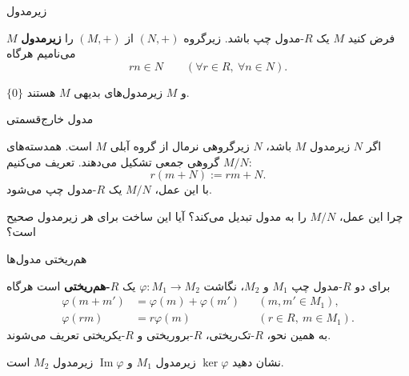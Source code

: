 \begin{frame}{زیرمدول}
    \label{lec04:submodule}
    \begin{definition}
        فرض کنید $M$ یک $R$-مدول چپ باشد.
        زیرگروه $(N,+)$ از $(M,+)$ را \textbf{زیرمدول} $M$ می‌نامیم هرگاه
        \[
            rn\in N\qquad(\forall r\in R,\ \forall n\in N).
        \]
    \end{definition}
    \begin{example}
        $\{0\}$ و $M$ زیرمدول‌های بدیهی $M$ هستند.
    \end{example}
\end{frame}

\begin{frame}{مدول خارج‌قسمتی}
    \label{lec04:quotient-module}
    \begin{definition}
        اگر $N$ زیرمدول $M$ باشد، $N$ زیرگروهی نرمال از گروه آبلی $M$ است.
        همدسته‌های $M/N$ گروهی جمعی تشکیل می‌دهند. تعریف می‌کنیم:
        \[
            r(m+N):=rm+N.
        \]
        با این عمل، $M/N$ یک $R$-مدول چپ می‌شود.
    \end{definition}
    \begin{exercise}
        چرا این عمل، $M/N$ را به مدول تبدیل می‌کند؟
        آیا این ساخت برای هر زیرمدول صحیح است؟
    \end{exercise}
\end{frame}

\begin{frame}{هم‌ریختی مدول‌ها}
    \label{lec04:module-homomorphism}
    \begin{definition}
        برای دو $R$-مدول چپ $M_1$ و $M_2$، نگاشت
        $\varphi:M_1\to M_2$ یک \textbf{$R$-هم‌ریختی} است هرگاه
        \[
        \begin{aligned}
            \varphi(m+m')&=\varphi(m)+\varphi(m')
                &&(m,m'\in M_1),\\
            \varphi(rm)&=r\varphi(m)
                &&(r\in R,\ m\in M_1).
        \end{aligned}
        \]
        به همین نحو، $R$-تک‌ریختی، $R$-بروریختی و $R$-یکریختی
        تعریف می‌شوند.
    \end{definition}
    \begin{exercise}
        نشان دهید $\ker\varphi$ زیرمدول $M_1$ و
        $\operatorname{Im}\varphi$ زیرمدول $M_2$ است.
    \end{exercise}
\end{frame}

